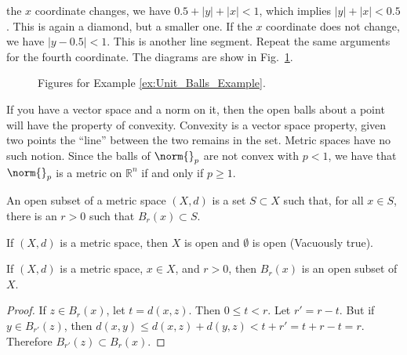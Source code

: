 \begin{example}
            the $x$ coordinate changes, we have
            $0.5+|y|+|x|<1$, which implies
            $|y|+|x|<0.5$. This is again a diamond, but a
            smaller one. If the $x$ coordinate does not
            change, we have $|y-0.5|<1$. This is another
            line segment. Repeat the same arguments for the
            fourth coordinate. The diagrams are show in
            Fig.~\ref{FUNCTIONAL:HOMEWORK:2:PROBLEM:4:FIGURES}.
        \begin{figure}[H]
            \centering
            \captionsetup{type=figure}
            
            \caption{Figures for Example \ref{ex:Unit_Balls_Example}.}
            \label{FUNCTIONAL:HOMEWORK:2:PROBLEM:4:FIGURES}
        \end{figure}
            \end{example}
            If you have a vector space and a norm on it,
            then the open balls about a point will have the
            property of convexity. Convexity is a vector space
            property, given two points the ``line'' between the
            two remains in the set. Metric spaces have no such
            notion. Since the balls of $\norm{}_{p}$ are not
            convex with $p<1$, we have that $\norm{}_{p}$ is
            a metric on $\mathbb{R}^{n}$
            if and only if $p\geq{1}$.
            \begin{definition}
                An open subset of a metric space
                $(X,d)$ is a set $S\subset{X}$ such that,
                for all $x\in{S}$, there is an
                $r>0$ such that
                $B_{r}(x)\subset{S}$.
            \end{definition}
            \begin{example}
                If $(X,d)$ is a metric space, then
                $X$ is open and $\emptyset$ is open
                (Vacuously true).
            \end{example}
            \begin{theorem}
                If $(X,d)$ is a metric space, $x\in{X}$,
                and $r>0$, then $B_{r}(x)$ is an open
                subset of $X$.
            \end{theorem}
            \begin{proof}
                If $z\in{B_{r}(x)}$, let $t=d(x,z)$.
                Then $0\leq{t}<r$. Let $r'=r-t$.
                But if $y\in{B_{r'}(z)}$, then
                $d(x,y)\leq{d(x,z)+d(y,z)}<t+r'=t+r-t=r$.
                Therefore $B_{r'}(z)\subset{B_{r}(x)}$.
            \end{proof}
